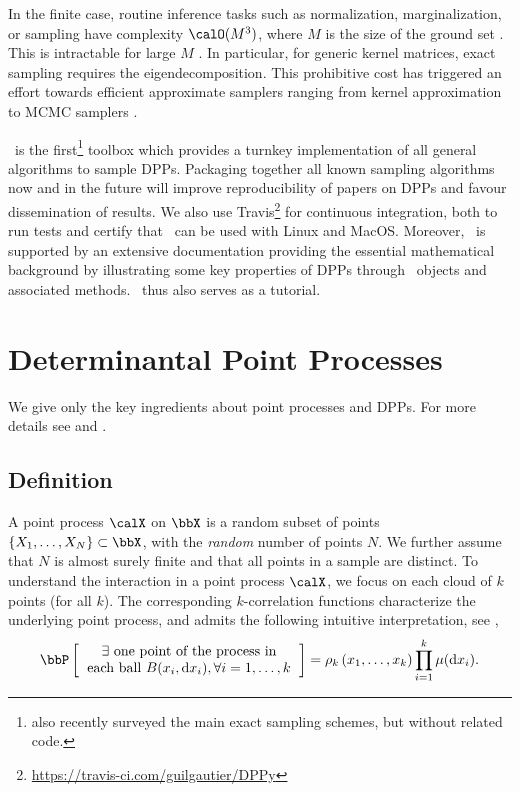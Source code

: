 \documentclass[twoside,11pt]{article}
\begin{document}
 In the finite case, routine inference tasks such as normalization, marginalization,  or sampling have complexity $\calO(M^3)$, where $M$ is the size of the ground set \citep{KuTa12}. This is  intractable for large $M$ \citep{Gil14}. 
  In particular, for generic kernel matrices, exact sampling requires the eigendecomposition. 
  This prohibitive cost has triggered an effort towards efficient approximate samplers ranging from kernel approximation \citep{AKFT13} to MCMC samplers \citep{AnGhRe16, LiJeSr16c, GaBaVa17}.
  
  \DPPy\ is the first\footnote{\citet{TrBaAm18} also recently surveyed the main exact sampling schemes, but without related code.}
 toolbox which provides a turnkey implementation of all general algorithms to sample DPPs.  Packaging together all known sampling algorithms now and in the future will improve reproducibility of papers on DPPs and favour dissemination of results.
  \setcounter{footnote}{5}
  We also use Travis\footnote{\url{https://travis-ci.com/guilgautier/DPPy}} for continuous integration, both to run tests and certify that \DPPy\ can be used with Linux and MacOS. 
  Moreover, \DPPy\ is supported by an extensive documentation providing the essential mathematical background by illustrating some key properties of DPPs through \DPPy\ objects and associated methods.
  \DPPy\ thus also serves as a tutorial.


\section{Determinantal Point Processes} %
\label{sec:determinantal_point_processes}

We give only the key ingredients about point processes and DPPs. For more details see \citet{DaVe03} and \citet{HKPV06}.

  \subsection{Definition} %
  \label{sub:definition}

    A point process $\calX$ on $\bbX$ is a random subset of points $\lrcb{X_1, \dots, X_N} \subset \bbX$, with the \emph{random} number of points $N$. We further assume that $N$ is almost surely finite and that all points in a sample are distinct.
    To understand the interaction in a point process $\calX$, we focus on each cloud of $k$ points (for all $k$). 
    The corresponding $k$-correlation functions characterize the underlying point process, and admits the following intuitive interpretation, see \citet[Section 4]{MoWa04},
    \begin{equation}
    	\Proba{
    		\begin{tabular}{c}
    			$\exists$ one point of the process in\\
    			each ball $B(x_i, \diff x_i), \forall i=1,\dots, k $
    		\end{tabular}
    	}
    	= \rho_k\lrp{x_1,\dots,x_k}
    		\prod_{i=1}^k \mu(\diff x_i).
    \end{equation}
\end{document}
